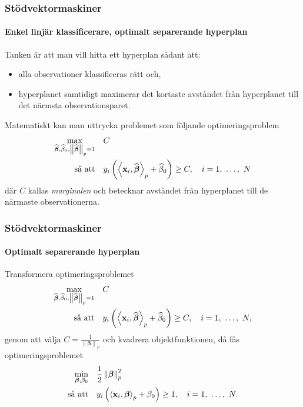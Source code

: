 \documentclass{beamer}
\theoremstyle{definition}
\theoremstyle{remark}
\newcommand{\bfbeta}{{\boldsymbol{\beta}}}
\newcommand{\bfx}{\mathbf{x}}
\newcommand{\llangle}{\left\langle}
\newcommand{\rrangle}{\right\rangle}
\newcommand{\inner}[2]{\llangle #1, #2 \rrangle}
\begin{document}
\begin{frame}
\frametitle{Stödvektormaskiner}
\framesubtitle{Enkel linjär klassificerare, optimalt separerande hyperplan}
Tanken är att man vill hitta ett hyperplan sådant att:
\begin{itemize}
	\item alla observationer klassificeras rätt och,
	\item hyperplanet samtidigt maximerar det kortaste avståndet från hyperplanet till det närmsta observationsparet.
\end{itemize}

Matematiskt kan man uttrycka problemet som följande optimeringsproblem
\begin{equation*}\label{opt:optimalmargin1}
\begin{aligned}
\operatornamewithlimits{max}_{\widehat{\bfbeta}, \widehat{\beta}_0, \left\|\widehat{\bfbeta}\right\|_p=1}& & &C\\
\text{så att}& & &y_i\left(\inner{\bfx_i}{\widehat{\bfbeta}}_p+\widehat{\beta}_0\right)\geq C,\quad i=1,~\dots,~N
\end{aligned}
\end{equation*}
där $C$ kallas \emph{marginalen} och betecknar avståndet från hyperplanet till de närmaste observationerna.
\end{frame}

\begin{frame}
\frametitle{Stödvektormaskiner}
\framesubtitle{Optimalt separerande hyperplan}
Transformera optimeringsproblemet
\begin{equation*}
\begin{aligned}
\operatornamewithlimits{max}_{\widehat{\bfbeta}, \widehat{\beta}_0, \left\|\widehat{\bfbeta}\right\|_p=1}& & &C\\
\text{så att}& & &y_i\left(\inner{\bfx_i}{\widehat{\bfbeta}}_p+\widehat{\beta}_0\right)\geq C,\quad i=1,~\dots,~N,
\end{aligned}
\end{equation*}
genom att välja $C=\frac{1}{\left\|\bfbeta
	\right\|_p}$ och kvadrera objektfunktionen, då fås optimeringsproblemet
	\begin{equation*}
	\begin{aligned}
	\operatornamewithlimits{min}_{\bfbeta, \beta_0} & & &\frac{1}{2}\left\|\bfbeta
	\right\|_p^2\\
	\text{så att} & & &y_i\left(\inner{\bfx_i}{\bfbeta}_p+\beta_0\right)\geq 1,\quad i=1,~\dots,~N.
	\end{aligned}
	\end{equation*}
\end{frame}
\end{document}
